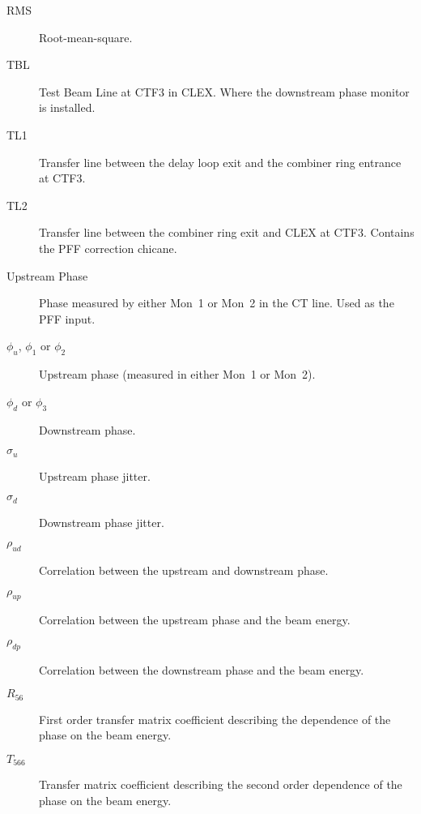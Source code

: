 \begin{description}
\item[RMS] Root-mean-square.
\item[TBL] Test Beam Line at CTF3 in CLEX. Where the downstream phase monitor is installed.
\item[TL1] Transfer line between the delay loop exit and the combiner ring entrance at CTF3.
\item[TL2] Transfer line between the combiner ring exit and CLEX at CTF3. Contains the PFF correction chicane.
\item[Upstream Phase] Phase measured by either Mon~1 or Mon~2 in the CT line. Used as the PFF input.

\item[\(\phi_{u}\), \(\phi_{1}\) or \(\phi_{2}\)] Upstream phase (measured in either Mon~1 or Mon~2).
\item[\(\phi_{d}\) or \(\phi_{3}\)] Downstream phase.
\item[\(\sigma_{u}\)] Upstream phase jitter.
\item[\(\sigma_{d}\)] Downstream phase jitter.
\item[\(\rho_{ud}\)] Correlation between the upstream and downstream phase.
\item[\(\rho_{up}\)] Correlation between the upstream phase and the beam energy.
\item[\(\rho_{dp}\)] Correlation between the downstream phase and the beam energy.
\item[\(R_{56}\)] First order transfer matrix coefficient describing the dependence of the phase on the beam energy.
\item[\(T_{566}\)] Transfer matrix coefficient describing the second order dependence of the phase on the beam energy.
\end{description}

